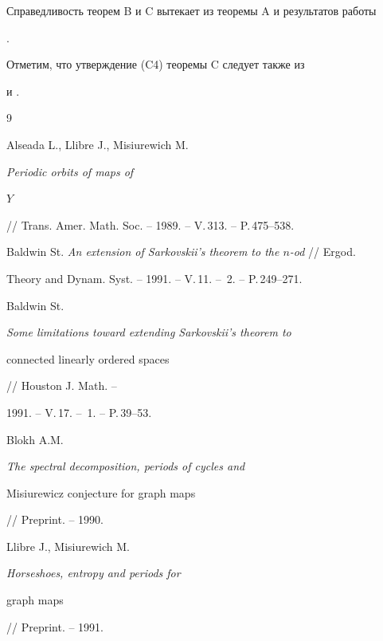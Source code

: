 Справедливость теорем B и C вытекает из теоремы A и результатов работы


\cite{Efr}.


Отметим, что утверждение (C4) теоремы C следует также из \cite{Blo}


и \cite{Lli}.








\begin{thebibliography}{9}







Alseada L., Llibre J., Misiurewich M. {\em Periodic orbits of maps of


$Y$} // Trans. Amer. Math. Soc. -- 1989. -- V.\,313. -- P.\,475--538.







Baldwin St. {\em An extension of Sarkovskii's theorem to the $n$-od} // Ergod.


Theory and Dynam. Syst. -- 1991. -- V.\,11. -- \No\,2. -- P.\,249--271.







Baldwin St. {\em Some limitations toward extending Sarkovskii's theorem to


connected linearly ordered spaces} // Houston J. Math. --


1991. -- V.\,17. -- \No\,1. -- P.\,39--53.







Blokh A.M. {\em The spectral decomposition, periods of cycles and


Misiurewicz conjecture for graph maps} // Preprint. -- 1990.







Llibre J., Misiurewich M. {\em Horseshoes, entropy and periods for


graph maps} // Preprint. -- 1991.










\end{thebibliography}
